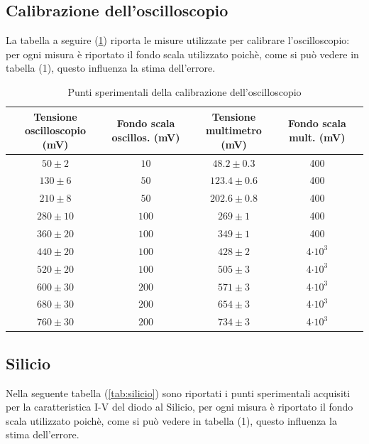 \documentclass[]{article}
\begin{document}
\subsection{Calibrazione dell'oscilloscopio}
La tabella a seguire (\ref{tab:calibrazione}) riporta le misure utilizzate per calibrare l'oscilloscopio: per ogni misura è riportato il fondo scala utilizzato poichè, come si può vedere in tabella (1), questo influenza la stima dell'errore. 
	\begin{table}[H]
		\centering
	\begin{tabular}{|c|c|c|c|c|}
		\hline
		Tensione oscilloscopio (mV)& Fondo scala oscillos. (mV) & Tensione multimetro (mV) & Fondo scala mult. (mV) \\
		\hline
		$ 50\pm 2 $ &$ 10 $ & $ 48.2\pm 0.3 $ &400\\
		\hline
		$ 130\pm 6$ &$ 50 $ & $ 123.4\pm 0.6 $ &400\\
		\hline
		$ 210\pm 8 $ &$ 50 $ & $ 202.6\pm 0.8 $ &400\\
		\hline
		$ 280\pm 10$ &$ 100 $ & $ 269\pm 1 $ &400\\
		\hline
		$ 360\pm 20 $ &$ 100 $ & $ 349\pm 1 $ &400\\
		\hline
		$ 440\pm 20 $ &$ 100 $ & $ 428\pm 2 $ &4$\cdot10^3$\\
		\hline
		$ 520\pm 20 $ &$ 100 $ & $ 505\pm 3 $ &4$\cdot10^3$\\
		\hline
		$ 600\pm 30 $ &$ 200 $ & $ 571\pm 3 $ &4$\cdot10^3$\\
		\hline
		$ 680\pm 30 $ &$ 200 $ & $ 654\pm 3 $&4$\cdot10^3$ \\
		\hline
		$ 760\pm 30 $ &$ 200 $ & $ 734\pm 3 $&4$\cdot10^3$ \\
		\hline
		
	\end{tabular}
\caption{Punti sperimentali della calibrazione dell'oscilloscopio}
\label{tab:calibrazione}
\end{table}
\subsection{Silicio}
Nella seguente tabella (\ref{tab:silicio}) sono riportati i punti sperimentali acquisiti per la caratteristica I-V del diodo al Silicio, per ogni misura è riportato il fondo scala utilizzato poichè, come si può vedere in tabella (1), questo influenza la stima dell'errore.
\end{document}

